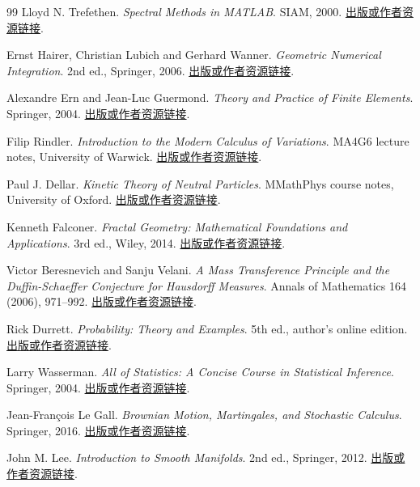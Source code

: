 \begin{thebibliography}{99}
 Lloyd N. Trefethen. \emph{Spectral Methods in MATLAB}. SIAM, 2000. \href{https://doi.org/10.1137/1.9780898719598}{出版或作者资源链接}.

 Ernst Hairer, Christian Lubich and Gerhard Wanner. \emph{Geometric Numerical Integration}. 2nd ed., Springer, 2006. \href{https://doi.org/10.1007/3-540-30666-8}{出版或作者资源链接}.

 Alexandre Ern and Jean-Luc Guermond. \emph{Theory and Practice of Finite Elements}. Springer, 2004. \href{https://doi.org/10.1007/978-1-4757-4355-5}{出版或作者资源链接}.

 Filip Rindler. \emph{Introduction to the Modern Calculus of Variations}. MA4G6 lecture notes, University of Warwick. \href{https://warwick.ac.uk/fac/sci/maths/people/staff/filip_rindler/cov_ln.pdf}{出版或作者资源链接}.

 Paul J. Dellar. \emph{Kinetic Theory of Neutral Particles}. MMathPhys course notes, University of Oxford. \href{https://people.maths.ox.ac.uk/dellar/MMPkinetic.html}{出版或作者资源链接}.

 Kenneth Falconer. \emph{Fractal Geometry: Mathematical Foundations and Applications}. 3rd ed., Wiley, 2014. \href{https://www.wiley.com/en-us/fractal-geometry-mathematical-foundations-and-applications-3rd-edition-p-9781118762868}{出版或作者资源链接}.

 Victor Beresnevich and Sanju Velani. \emph{A Mass Transference Principle and the Duffin-Schaeffer Conjecture for Hausdorff Measures}. Annals of Mathematics 164 (2006), 971--992. \href{https://doi.org/10.4007/annals.2006.164.971}{出版或作者资源链接}.

 Rick Durrett. \emph{Probability: Theory and Examples}. 5th ed., author's online edition. \href{https://sites.math.duke.edu/~rtd/PTE/pte.html}{出版或作者资源链接}.

 Larry Wasserman. \emph{All of Statistics: A Concise Course in Statistical Inference}. Springer, 2004. \href{https://www.stat.cmu.edu/~larry/all-of-statistics/}{出版或作者资源链接}.

 Jean-François Le Gall. \emph{Brownian Motion, Martingales, and Stochastic Calculus}. Springer, 2016. \href{https://doi.org/10.1007/978-3-319-31089-3}{出版或作者资源链接}.

 John M. Lee. \emph{Introduction to Smooth Manifolds}. 2nd ed., Springer, 2012. \href{https://sites.math.washington.edu/~lee/Books/ISM/}{出版或作者资源链接}.


\end{thebibliography}
